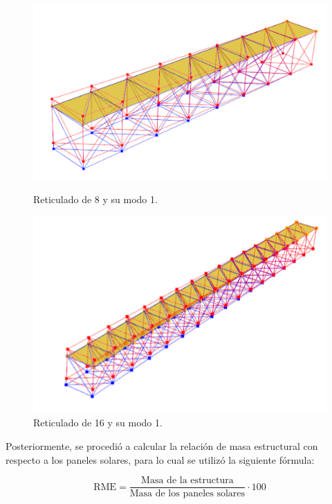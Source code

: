 \begin{figure}[H]
    \begin{minipage}[b]{0.5\textwidth}
        \centering
        \includegraphics[width=\textwidth]{FOTOS/m1_8.png}
        \caption{Reticulado de 8 y su modo 1.}
    \end{minipage}
    \hfill
    \begin{minipage}[b]{0.5\textwidth}
        \centering
        \includegraphics[width=\textwidth]{FOTOS/m1_16.png}
        \caption{Reticulado de 16 y su modo 1.}
    \end{minipage}
\end{figure}

Posteriormente, se procedió a calcular la relación de masa estructural con respecto a los paneles solares, para lo cual se utilizó la siguiente fórmula:

\begin{equation}
    \text{RME} = \frac{\text{Masa de la estructura}}{\text{Masa de los paneles solares}} \cdot 100
\end{equation}

